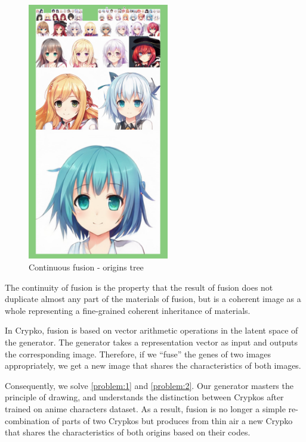\documentclass[a4paper]{article}
\begin{document}
\begin{figure}[h]
  \centering
  \includegraphics[width=0.55\textwidth]{703057_tree.png}
  \caption{Continuous fusion - origins tree}\label{origins_tree}
\end{figure}

The continuity of fusion is the property that the result of fusion does not duplicate almost any part of the materials of fusion, but is a coherent image as a whole representing a fine-grained coherent inheritance of materials.

In Crypko, fusion is based on vector arithmetic operations in the latent space of the generator\cite{radford2015unsupervised}. The generator takes a representation vector as input and outputs the corresponding image. Therefore, if we ``fuse'' the genes of two images appropriately, we get a new image that shares the characteristics of both images.

Consequently, we solve \ref{problem:1} and \ref{problem:2}. 
Our generator masters the principle of drawing, and understands the distinction between Crypkos after trained on anime characters dataset. 
As a result, fusion is no longer a simple re-combination of parts of two Crypkos but produces from thin air a new Crypko that shares the characteristics of both origins based on their codes.
\end{document}
